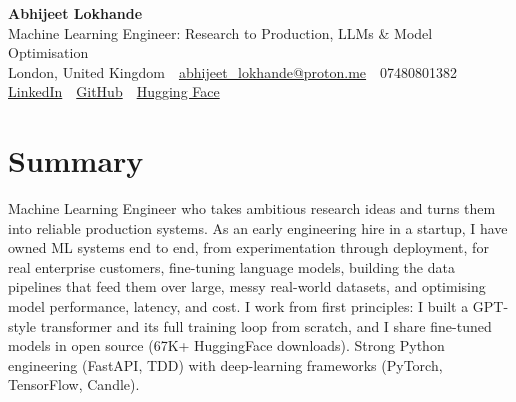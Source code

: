 \documentclass[10pt,a4paper]{article}
\newcommand{\sep}{\,\textcolor{accent!60}{\textbar}\,}
\begin{document}
\begin{center}
  {\fontsize{24}{26}\selectfont\bfseries Abhijeet Lokhande}\\[3pt]
  {\color{accent}\large Machine Learning Engineer: Research to Production, LLMs \& Model Optimisation}\\[5pt]
  {\small
    London, United Kingdom \sep
    \href{mailto:abhijeet_lokhande@proton.me}{abhijeet\_lokhande@proton.me} \sep
    07480801382 \\[2pt]
    \href{https://www.linkedin.com/in/ablds/}{LinkedIn} \sep
    \href{https://github.com/abhijeetscode}{GitHub} \sep
    \href{https://huggingface.co/ab-ai}{Hugging Face}
  }
\end{center}
\vspace{2pt}

\section{Summary}
Machine Learning Engineer who takes ambitious research ideas and turns them into reliable production systems. As an early engineering hire in a startup, I have owned ML systems end to end, from experimentation through deployment, for real enterprise customers, fine-tuning language models, building the data pipelines that feed them over large, messy real-world datasets, and optimising model performance, latency, and cost. I work from first principles: I built a GPT-style transformer and its full training loop from scratch, and I share fine-tuned models in open source (67K+ HuggingFace downloads). Strong Python engineering (FastAPI, TDD) with deep-learning frameworks (PyTorch, TensorFlow, Candle).

\end{document}
